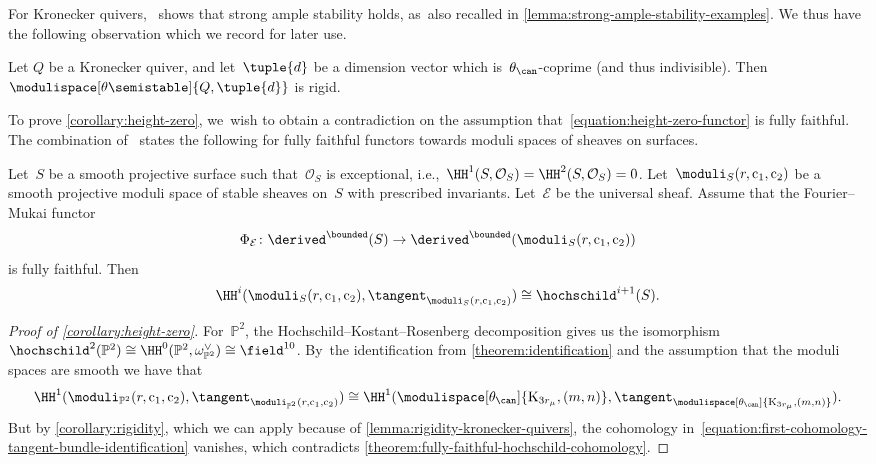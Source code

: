 For Kronecker quivers,~\cite[Prop.\,6.2]{MR3683503}
shows that strong ample stability holds, as~also recalled in \cref{lemma:strong-ample-stability-examples}.
We thus have the following observation which we record for later use.

\begin{lemma}
\label{lemma:rigidity-kronecker-quivers}
Let $Q$ be a Kronecker quiver,
and let~$\tuple{d}$ be a dimension vector
which is~$\theta_\can$-coprime (and thus indivisible).
Then~$\modulispace[\theta\semistable]{Q,\tuple{d}}$ is rigid.
\end{lemma}

To prove \cref{corollary:height-zero}, we~wish to obtain a contradiction on the assumption that~\eqref{equation:height-zero-functor} is fully faithful.
The combination of~\cite[Prop.\,29, Rem.\,30]{MR3950704} states the following
for fully faithful functors towards moduli spaces of sheaves on surfaces.
\begin{theorem}
\label{theorem:fully-faithful-hochschild-cohomology}
Let~$S$ be a smooth projective surface
such that~$\mathcal{O}_S$ is exceptional,
i.e.,~$\HH^1(S,\mathcal{O}_S)=\HH^2(S,\mathcal{O}_S)=0$.
Let~$\moduli_S(r,\mathrm{c}_1,\mathrm{c}_2)$ be a smooth projective moduli space
of stable sheaves on~$S$ with prescribed invariants.
Let~$\mathcal{E}$ be the universal sheaf.
Assume that the Fourier--Mukai functor
\begin{equation*}
\Phi_{\mathcal{E}}\colon\derived^\bounded(S)\to\derived^\bounded(\moduli_S(r,\mathrm{c}_1,\mathrm{c}_2))
\end{equation*}
is fully faithful.
Then
\begin{equation*}
\HH^i(\moduli_S(r,\mathrm{c}_1,\mathrm{c}_2),\tangent_{\moduli_S(r,\mathrm{c}_1,\mathrm{c}_2)})
\cong
\hochschild^{i+1}(S).
\end{equation*}
\end{theorem}

\begin{proof}[Proof of \cref{corollary:height-zero}]
For~$\mathbb{P}^2$,
the Hochschild--Kostant--Rosenberg decomposition
gives us the isomorphism~$\hochschild^2(\mathbb{P}^2)\cong\HH^0(\mathbb{P}^2,\omega_{\mathbb{P}^2}^\vee)\cong\field^{10}$. By~the identification from \cref{theorem:identification}
and the assumption that the moduli spaces are smooth
we have that
\begin{equation}
\label{equation:first-cohomology-tangent-bundle-identification}
\HH^1(\moduli_{\mathbb{P}^2}(r,\mathrm{c}_1,\mathrm{c}_2),\tangent_{\moduli_{\mathbb{P}^2}(r,\mathrm{c}_1,\mathrm{c}_2)})
\cong
\HH^1(\modulispace[\theta_\can]{\mathrm{K}_{3r_\mu},(m,n)},\tangent_{\modulispace[\theta_\can]{\mathrm{K}_{3r_\mu},(m,n)}}).
\end{equation}
But by \cref{corollary:rigidity},
which we can apply because of \cref{lemma:rigidity-kronecker-quivers},
the cohomology in~\eqref{equation:first-cohomology-tangent-bundle-identification} vanishes,
which contradicts \cref{theorem:fully-faithful-hochschild-cohomology}.
\end{proof}

